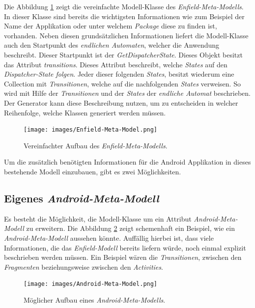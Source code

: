 Die Abbildung \ref{fig:enfield-model} zeigt die vereinfachte Modell-Klasse des \textit{Enfield-Meta-Modells}. 
In dieser Klasse sind bereits die wichtigsten Informationen wie zum Beispiel der Name der Applikation oder unter welchem \textit{Package} diese zu finden ist, vorhanden. Neben diesen grundsätzlichen Informationen liefert die Modell-Klasse auch den Startpunkt des \textit{endlichen Automaten}, welcher die Anwendung beschreibt. Dieser Startpunkt ist der \textit{GetDispatcherState}. Dieses Objekt besitzt das Attribut \textit{transitions}. Dieses Attribut beschreibt, welche \textit{States} auf den \textit{Dispatcher-State folgen}. Jeder dieser folgenden \textit{States}, besitzt wiederum eine Collection mit \textit{Transitionen}, welche auf die nachfolgenden \textit{States} verweisen. So wird mit Hilfe der \textit{Transitionen} und der \textit{States} der \textit{endliche Automat} beschrieben. Der Generator kann diese Beschreibung nutzen, um zu entscheiden in welcher Reihenfolge, welche Klassen generiert werden müssen.

\begin{figure}[H]
	\begin{center}
		\texttt{[image: images/Enfield-Meta-Model.png]}
		\caption{Vereinfachter Aufbau des \textit{Enfield-Meta-Modells}.}
		\label{fig:enfield-model}
	\end{center}
\end{figure}

Um die zusätzlich benötigten Informationen für die Android Applikation in dieses bestehende Modell einzubauen, gibt es zwei Möglichkeiten.

\subsection{Eigenes \textit{Android-Meta-Modell}}

Es besteht die Möglichkeit, die Modell-Klasse um ein Attribut \textit{Android-Meta-Modell} zu erweitern.
Die Abbildung \ref{fig:android-model} zeigt schemenhaft ein Beispiel, wie ein \textit{Android-Meta-Modell} aussehen könnte. Auffällig hierbei ist, dass viele Informationen, die das \textit{Enfield-Modell} bereits liefern würde, noch einmal explizit beschrieben werden müssen. Ein Beispiel wären die \textit{Transitionen}, zwischen den \textit{Fragmenten} beziehungsweise zwischen den \textit{Activities}. 


\begin{figure}[H]
	\begin{center}
		\texttt{[image: images/Android-Meta-Model.png]}
		\caption{Möglicher Aufbau eines \textit{Android-Meta-Modells}.}
		\label{fig:android-model}
	\end{center}
\end{figure}

